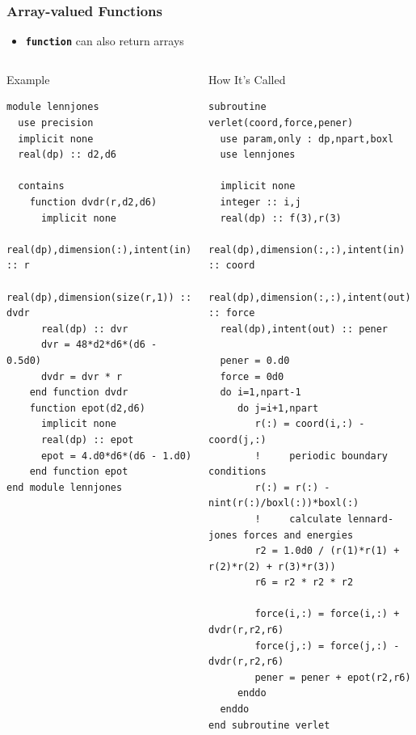 \documentclass[slidestop,mathserif,compress,xcolor=svgnames]{beamer}
\newenvironment{bblock}[0]
{
\begin{beamerboxesrounded}[upper=uppercol1,lower=lowercol1,shadow=true]}
{\end{beamerboxesrounded}}
\newenvironment{eeblock}[0]
{
\begin{beamerboxesrounded}[upper=uppercol4,lower=lowercol4,shadow=true]}
{\end{beamerboxesrounded}}
\begin{document}
\begin{frame}[fragile]%
  \frametitle{\small Array-valued Functions}
  \begin{bblock}{}
    \begin{itemize}
      \item \textbf{\texttt{function}} can also return arrays
    \end{itemize}
  \end{bblock}
  {\fontsize{4}{5}
    \begin{columns}
      \column{5.5cm}
      \begin{eeblock}{Example}
        \begin{verbatim}
module lennjones
  use precision
  implicit none
  real(dp) :: d2,d6
  
  contains
    function dvdr(r,d2,d6)
      implicit none
      real(dp),dimension(:),intent(in) :: r
      real(dp),dimension(size(r,1)) :: dvdr
      real(dp) :: dvr
      dvr = 48*d2*d6*(d6 - 0.5d0)
      dvdr = dvr * r
    end function dvdr
    function epot(d2,d6)
      implicit none
      real(dp) :: epot
      epot = 4.d0*d6*(d6 - 1.d0)
    end function epot
end module lennjones
        \end{verbatim}
      \end{eeblock}
      \column{5.5cm}
      \begin{eeblock}{How It's Called}
        \begin{verbatim}
subroutine verlet(coord,force,pener)
  use param,only : dp,npart,boxl
  use lennjones

  implicit none
  integer :: i,j
  real(dp) :: f(3),r(3)
  real(dp),dimension(:,:),intent(in) :: coord
  real(dp),dimension(:,:),intent(out) :: force
  real(dp),intent(out) :: pener
  
  pener = 0.d0
  force = 0d0
  do i=1,npart-1
     do j=i+1,npart
        r(:) = coord(i,:) - coord(j,:)
        !     periodic boundary conditions
        r(:) = r(:) - nint(r(:)/boxl(:))*boxl(:)
        !     calculate lennard-jones forces and energies
        r2 = 1.0d0 / (r(1)*r(1) + r(2)*r(2) + r(3)*r(3))
        r6 = r2 * r2 * r2

        force(i,:) = force(i,:) + dvdr(r,r2,r6)
        force(j,:) = force(j,:) - dvdr(r,r2,r6)
        pener = pener + epot(r2,r6)
     enddo
  enddo
end subroutine verlet
        \end{verbatim}
      \end{eeblock}
    \end{columns}
  }
\end{frame}
\end{document}
